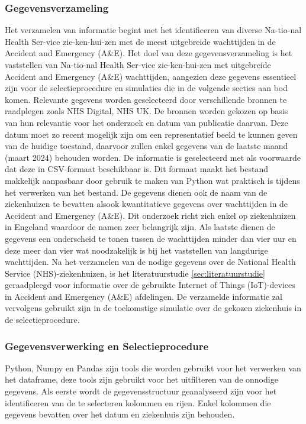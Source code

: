 \subsubsection*{Gegevensverzameling}
Het verzamelen van informatie begint met het identificeren van diverse Na-tio-nal Health Ser-vice zie-ken-hui-zen
met de meest uitgebreide wachttijden in de Accident and Emergency (A\&E). Het doel van deze gegevensverzameling is het vaststellen van Na-tio-nal Health Ser-vice zie-ken-hui-zen met uitgebreide Accident and Emergency (A\&E) wachttijden, aangezien deze gegevens essentieel zijn voor de selectieprocedure en simulaties die in de volgende secties aan bod komen. Relevante gegevens worden geselecteerd door verschillende bronnen te raadplegen zoals NHS Digital, NHS UK. De bronnen worden gekozen op basis van hun relevantie voor het onderzoek en datum van publicatie daarvan. Deze datum moet zo recent mogelijk zijn om een representatief beeld te kunnen geven van de huidige toestand, daarvoor zullen enkel gegevens van de laatste maand (maart 2024) behouden worden. De informatie is geselecteerd met als voorwaarde dat deze in CSV-formaat beschikbaar is. Dit formaat maakt het bestand makkelijk aanpasbaar door gebruik te maken van Python wat praktisch is tijdens het verwerken van het bestand. De gegevens dienen ook de naam van de ziekenhuizen te bevatten alsook kwantitatieve gegevens over wachttijden in de Accident and Emergency (A\&E). Dit onderzoek richt zich enkel op ziekenhuizen in Engeland waardoor de namen zeer belangrijk zijn. Als laatste dienen de gegevens een onderscheid te tonen tussen de wachttijden minder dan vier uur en deze meer dan vier wat noodzakelijk is bij het vaststellen van langdurige wachttijden. Na het verzamelen van de nodige gegevens over de National Health Service (NHS)-ziekenhuizen, is het literatuurstudie \ref{sec:literatuurstudie} geraadpleegd voor informatie over de gebruikte Internet of Things (IoT)-devices in Accident and Emergency (A\&E) afdelingen. De verzamelde informatie zal vervolgens gebruikt zijn in de toekomstige simulatie over de gekozen ziekenhuis in de selectieprocedure.

\subsubsection*{Gegevensverwerking en Selectieprocedure}
Python, Numpy en Pandas zijn tools die worden gebruikt voor het verwerken van het dataframe, deze tools zijn gebruikt voor het uitfilteren van de onnodige gegevens. Als eerste wordt de gegevensstructuur geanalyseerd zijn voor het identificeren van de te selecteren kolommen en rijen. Enkel kolommen die gegevens bevatten over het datum en ziekenhuis zijn behouden.

